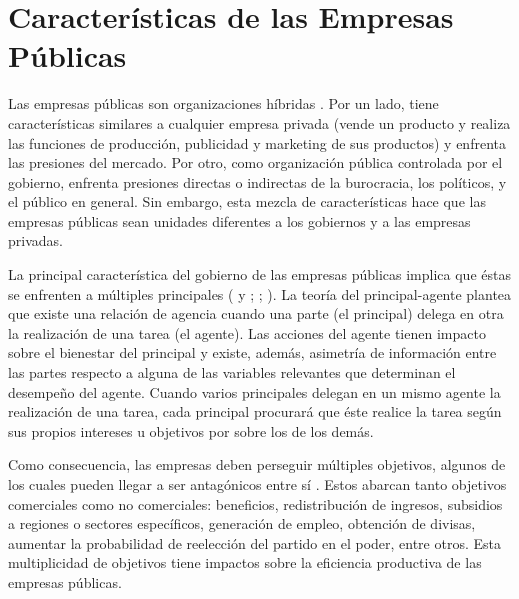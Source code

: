 \documentclass[
  12pt,
  spanish,
]{book}
\begin{document}
\hypertarget{caracteruxedsticas-de-las-empresas-puxfablicas}{%
\section{Características de las Empresas Públicas}\label{caracteruxedsticas-de-las-empresas-puxfablicas}}

Las empresas públicas son organizaciones híbridas \citep{Jones1982}. Por un lado, tiene características similares a cualquier empresa privada (vende un producto y realiza las funciones de producción, publicidad y marketing de sus productos) y enfrenta las presiones del mercado. Por otro, como organización pública controlada por el gobierno, enfrenta presiones directas o indirectas de la burocracia, los políticos, y el público en general. Sin embargo, esta mezcla de características hace que las empresas públicas sean unidades diferentes a los gobiernos y a las empresas privadas.

La principal característica del gobierno de las empresas públicas implica que éstas se enfrenten a múltiples principales (\citet{Dixit1998} y \citet{Dixit1997}; \citet{Martimort1996}; \citet{Tirole1994}). La teoría del principal-agente plantea que existe una relación de agencia cuando una parte (el principal) delega en otra la realización de una tarea (el agente). Las acciones del agente tienen impacto sobre el bienestar del principal y existe, además, asimetría de información entre las partes respecto a alguna de las variables relevantes que determinan el desempeño del agente. Cuando varios principales delegan en un mismo agente la realización de una tarea, cada principal procurará que éste realice la tarea según sus propios intereses u objetivos por sobre los de los demás.

Como consecuencia, las empresas deben perseguir múltiples objetivos, algunos de los cuales pueden llegar a ser antagónicos entre sí \citep{Tirole1994}. Estos abarcan tanto objetivos comerciales como no comerciales: beneficios, redistribución de ingresos, subsidios a regiones o sectores específicos, generación de empleo, obtención de divisas, aumentar la probabilidad de reelección del partido en el poder, entre otros. Esta multiplicidad de objetivos tiene impactos sobre la eficiencia productiva de las empresas públicas.
\end{document}
